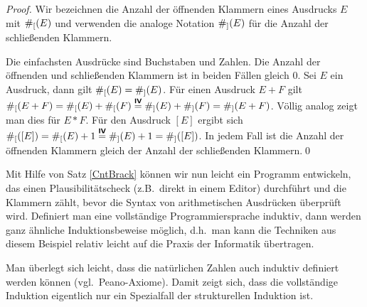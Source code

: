 \begin{proof}
Wir bezeichnen die Anzahl der öffnenden Klammern eines Ausdrucks $E$
mit $\#_[(E)$ und verwenden die analoge Notation $\#_](E)$ für die
Anzahl der schließenden Klammern.

\induproof%
{
Die einfachsten Ausdrücke sind Buchstaben und Zahlen. Die Anzahl der
öffnenden und schließenden Klammern ist in beiden Fällen gleich $0$.
}
{
Sei $E$ ein Ausdruck, dann gilt $\#_[(E) = \#_](E)$.
}
{
 Für einen Ausdruck $E + F$ gilt $\#_[(E + F) = \#_[(E
) +
 \#_[(F) \stackrel{\text{\textbf{\textsf{IV}}}}{=} \#_](E) +
 \#_](F) = \#_](E + F)$. Völlig analog zeigt man dies für $E *
 F$. Für den Ausdruck $[E]$ ergibt sich $\#_[([E]) = \#_[(E) + 1
 \stackrel{\text{\textbf{\textsf{IV}}}}{=} \#_](E) + 1 = \#_]([E])$.
 In jedem Fall ist die Anzahl der öffnenden Klammern gleich der Anzahl
 der schließenden Klammern.\qed
}
\end{proof}

\bigskip

Mit Hilfe von Satz \ref{CntBrack} können wir nun leicht ein Programm
entwickeln, das einen Plausibilitätscheck (z.B.~direkt in einem Editor)
durchführt und die Klammern zählt, bevor die Syntax von arithmetischen
Ausdrücken überprüft wird. Definiert man eine vollständige
Programmiersprache induktiv, dann werden ganz ähnliche
Induktionsbeweise möglich, d.h.~man kann die Techniken aus diesem
Beispiel relativ leicht auf die Praxis der Informatik übertragen.

Man überlegt sich leicht, dass die natürlichen Zahlen auch induktiv
definiert werden können (vgl.~Peano-Axiome). Damit zeigt sich, dass die vollständige
Induktion eigentlich nur ein Spezialfall der strukturellen Induktion
ist.

